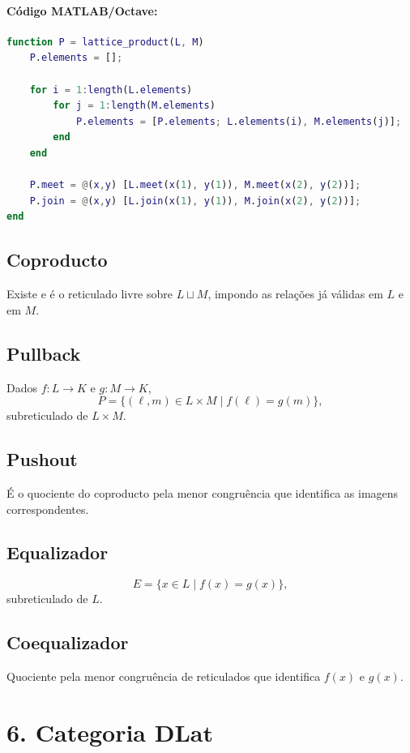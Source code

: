 \documentclass[a4paper,12pt]{article}
\begin{document}
\paragraph{Código MATLAB/Octave:}
\begin{lstlisting}[language=Matlab]
function P = lattice_product(L, M)
    P.elements = [];
    
    for i = 1:length(L.elements)
        for j = 1:length(M.elements)
            P.elements = [P.elements; L.elements(i), M.elements(j)];
        end
    end
    
    P.meet = @(x,y) [L.meet(x(1), y(1)), M.meet(x(2), y(2))];
    P.join = @(x,y) [L.join(x(1), y(1)), M.join(x(2), y(2))];
end
\end{lstlisting}

\subsection*{Coproducto}

Existe e é o reticulado livre sobre $L\sqcup M$, impondo as relações já válidas
em $L$ e em $M$.

\subsection*{Pullback}

Dados $f:L\to K$ e $g:M\to K$,
\[
P=\{(\ell,m)\in L\times M \mid f(\ell)=g(m)\},
\]
subreticulado de $L\times M$.

\subsection*{Pushout}

É o quociente do coproducto pela menor congruência que identifica as imagens
correspondentes.

\subsection*{Equalizador}

\[
E=\{x\in L\mid f(x)=g(x)\},
\]
subreticulado de $L$.

\subsection*{Coequalizador}

Quociente pela menor congruência de reticulados que identifica $f(x)$ e $g(x)$.

\section*{6. Categoria \(\mathbf{DLat}\)}
\end{document}
